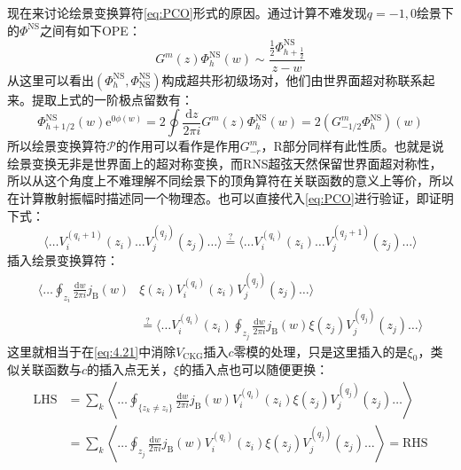 现在来讨论绘景变换算符\ref{eq:PCO}形式的原因。通过计算不难发现$q=-1,0$绘景下的$\Phi^{\text{NS}}$之间有如下OPE：
\begin{equation}
	G^m(z)\Phi_h^{\text{NS}}(w)\sim\frac{\frac12\Phi_{h+\frac12}^{\text{NS}}}{z-w}
\end{equation}
从这里可以看出$(\Phi^{\text{NS}}_h,\Phi^{\text{NS}}_{\text{NS}})$构成超共形初级场对，他们由世界面超对称联系起来。提取上式的一阶极点留数有：
\begin{equation}
	\Phi_{h+1/2}^{\mathrm{NS}}(w)\mathrm{e}^{0\phi(w)}=2\oint\frac{\mathrm{d}z}{2\pi i}G^m(z)\Phi_h^{\mathrm{NS}}(w)=2(G^m_{-1/2}\Phi_h^{\mathrm{NS}})(w)
\end{equation}
所以绘景变换算符$\mathcal{P}$的作用可以看作是作用$G^m_{-r}$，R部分同样有此性质。也就是说绘景变换无非是世界面上的超对称变换，而RNS超弦天然保留世界面超对称性，所以从这个角度上不难理解不同绘景下的顶角算符在关联函数的意义上等价，所以在计算散射振幅时描述同一个物理态。也可以直接代入\ref{eq:PCO}进行验证，即证明下式：
\begin{equation}
		\langle\ldots V_i^{(q_i+1)}(z_i)\ldots V_j^{(q_j)}(z_j)\ldots\rangle\overset{?}{\operatorname*{\operatorname*{=}}}\langle\ldots V_i^{(q_i)}(z_i)\ldots V_j^{(q_j+1)}(z_j)\ldots\rangle
\end{equation}
插入绘景变换算符：
\begin{equation}
\begin{aligned}
		\bigg\langle\ldots\oint_{z_i}\frac{\mathrm{d}w}{2\pi i}j_{\mathrm{B}}(w)&\xi(z_i)V_i^{(q_i)}(z_i)V_j^{(q_j)}(z_j)\ldots\bigg\rangle\\&\overset{?}{\operatorname*{=}}
		\bigg\langle\ldots V_i^{(q_i)}(z_i)\oint_{z_j}\frac{\mathrm{d}w}{2\pi i}j_{\mathrm{B}}(w)\xi(z_j)V_j^{(q_j)}(z_j)\ldots\bigg\rangle
\end{aligned}
\end{equation}
这里就相当于在\ref{eq:4.21}中消除$V_{\text{CKG}}$插入$c$零模的处理，只是这里插入的是$\xi_0$，类似关联函数与$c$的插入点无关，$\xi$的插入点也可以随便更换：
\begin{equation}
\begin{aligned}
		\text{LHS} &= \sum_{k}\left\langle\ldots\oint_{\{z_k\neq z_i\}}\frac{\mathrm{d}w}{2\pi i}j_{\mathrm{B}}(w)V_i^{(q_i)}(z_i)\xi(z_j)V_j^{(q_j)}(z_j)\ldots\right\rangle\\
		&=\sum_{k}\left\langle\ldots\oint_{z_j}\frac{\mathrm{d}w}{2\pi i}j_{\mathrm{B}}(w)V_i^{(q_i)}(z_i)\xi(z_j)V_j^{(q_j)}(z_j)\ldots\right\rangle=\text{RHS}\\
\end{aligned}
\end{equation}
